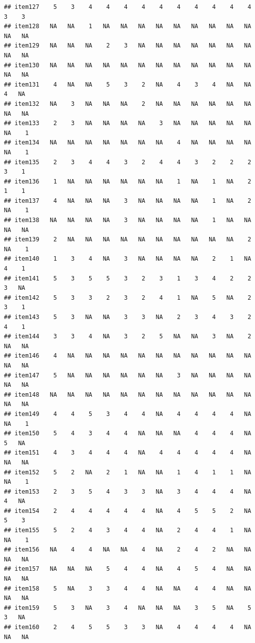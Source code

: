 \documentclass[
  man]{apa6}
\begin{document}
\begin{verbatim}
## item127    5    3    4    4    4    4    4    4    4    4    4    4    3    3
## item128   NA   NA    1   NA   NA   NA   NA   NA   NA   NA   NA   NA   NA   NA
## item129   NA   NA   NA    2    3   NA   NA   NA   NA   NA   NA   NA   NA   NA
## item130   NA   NA   NA   NA   NA   NA   NA   NA   NA   NA   NA   NA   NA   NA
## item131    4   NA   NA    5    3    2   NA    4    3    4   NA   NA    4   NA
## item132   NA    3   NA   NA   NA    2   NA   NA   NA   NA   NA   NA   NA   NA
## item133    2    3   NA   NA   NA   NA    3   NA   NA   NA   NA   NA   NA    1
## item134   NA   NA   NA   NA   NA   NA   NA    4   NA   NA   NA   NA   NA    1
## item135    2    3    4    4    3    2    4    4    3    2    2    2    3    1
## item136    1   NA   NA   NA   NA   NA   NA    1   NA    1   NA    2    1    1
## item137    4   NA   NA   NA    3   NA   NA   NA   NA    1   NA    2   NA    1
## item138   NA   NA   NA   NA    3   NA   NA   NA   NA    1   NA   NA   NA   NA
## item139    2   NA   NA   NA   NA   NA   NA   NA   NA   NA   NA    2   NA    1
## item140    1    3    4   NA    3   NA   NA   NA   NA    2    1   NA    4    1
## item141    5    3    5    5    3    2    3    1    3    4    2    2    3   NA
## item142    5    3    3    2    3    2    4    1   NA    5   NA    2    3    1
## item143    5    3   NA   NA    3    3   NA    2    3    4    3    2    4    1
## item144    3    3    4   NA    3    2    5   NA   NA    3   NA    2   NA   NA
## item146    4   NA   NA   NA   NA   NA   NA   NA   NA   NA   NA   NA   NA   NA
## item147    5   NA   NA   NA   NA   NA   NA    3   NA   NA   NA   NA   NA   NA
## item148   NA   NA   NA   NA   NA   NA   NA   NA   NA   NA   NA   NA   NA   NA
## item149    4    4    5    3    4    4   NA    4    4    4    4   NA   NA    1
## item150    5    4    3    4    4   NA   NA   NA    4    4    4   NA    5   NA
## item151    4    3    4    4    4   NA    4    4    4    4    4   NA   NA   NA
## item152    5    2   NA    2    1   NA   NA    1    4    1    1   NA   NA    1
## item153    2    3    5    4    3    3   NA    3    4    4    4   NA    4   NA
## item154    2    4    4    4    4    4   NA    4    5    5    2   NA    5    3
## item155    5    2    4    3    4    4   NA    2    4    4    1   NA   NA    1
## item156   NA    4    4   NA   NA    4   NA    2    4    2   NA   NA   NA   NA
## item157   NA   NA   NA    5    4    4   NA    4    5    4   NA   NA   NA   NA
## item158    5   NA    3    3    4    4   NA   NA    4    4   NA   NA   NA   NA
## item159    5    3   NA    3    4   NA   NA   NA    3    5   NA    5    3   NA
## item160    2    4    5    5    3    3   NA    4    4    4    4   NA   NA   NA

\end{verbatim}
\end{document}
